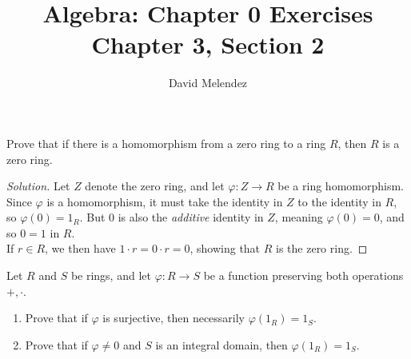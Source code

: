 \documentclass[12pt]{article}
\newenvironment{problem}[2][Problem]{\begin{trivlist}
\item[\hskip \labelsep {\bfseries #1}\hskip \labelsep {\bfseries #2.}]}{\end{trivlist}}
\newenvironment{solution}
  {\renewcommand\qedsymbol{$\blacksquare$}\begin{proof}[Solution]}
{\end{proof}}
\theoremstyle{remark}
\begin{document}
\title{Algebra: Chapter 0 Exercises\\ \large Chapter 3, Section 2}
\author{David Melendez}
\maketitle

\begin{problem}{2.1}
Prove that if there is a homomorphism from a zero ring to a ring $R$, then $R$ is a zero ring.
\end{problem}
\begin{solution}
  Let $Z$ denote the zero ring, and let $\varphi : Z\to R$ be a ring homomorphism.
  Since $\varphi$ is a homomorphism, it must take the identity in $Z$ to the identity in $R$,
  so $\varphi(0) = 1_R$.
  But 0 is also the \textit{additive} identity in $Z$, meaning $\varphi(0) = 0$,
  and so $0 = 1$ in $R$.\\
  \indent If $r\in R$, we then have $1\cdot r = 0\cdot r = 0$, showing that $R$ is the zero ring.
\end{solution}

\begin{problem}{2.2}
  Let $R$ and $S$ be rings, and let $\varphi : R\to S$ be a function preserving both operations
  $+,\cdot$.
  \begin{enumerate}
    \item Prove that if $\varphi$ is surjective, then necessarily $\varphi(1_R) = 1_S$.
    \item Prove that if $\varphi\neq0$ and $S$ is an integral domain, then $\varphi(1_R)=1_S$.
  \end{enumerate}
\end{problem}
\end{document}
